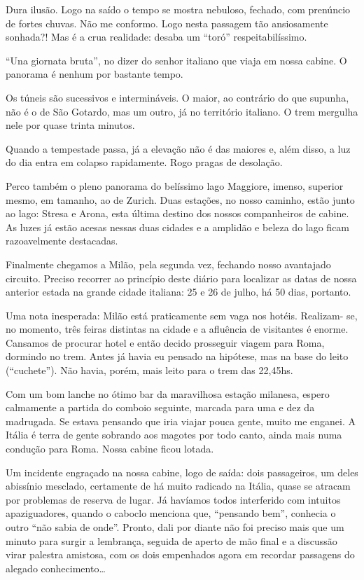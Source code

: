 Dura ilusão. Logo na saído o tempo se mostra nebuloso, fechado, com prenúncio de fortes chuvas. Não me conformo. Logo nesta passagem tão ansiosamente sonhada?! Mas é a crua realidade: desaba um ``toró'' respeitabilíssimo.

``Una giornata bruta'', no dizer do senhor italiano que viaja em nossa cabine. O panorama é nenhum por bastante tempo.

Os túneis são sucessivos e intermináveis. O maior, ao contrário do que supunha, não é o de São Gotardo, mas um outro, já no território italiano. O trem mergulha nele por quase trinta minutos.

Quando a tempestade passa, já a elevação não é das maiores e, além disso, a luz do dia entra em colapso rapidamente. Rogo pragas de desolação.

Perco também o pleno panorama do belíssimo lago Maggiore, imenso, superior mesmo, em tamanho, ao de Zurich. Duas estações, no nosso caminho, estão junto ao lago: Stresa e Arona, esta última destino dos nossos companheiros de cabine. As luzes já estão acesas nessas duas cidades e a amplidão e beleza do lago ficam razoavelmente destacadas.

Finalmente chegamos a Milão, pela segunda vez, fechando nosso avantajado circuito. Preciso recorrer ao princípio deste diário para localizar as datas de nossa anterior estada na grande cidade italiana: 25 e 26 de julho, há 50 dias, portanto.

Uma nota inesperada: Milão está praticamente sem vaga nos hotéis. Realizam- se, no momento, três feiras distintas na cidade e a afluência de visitantes é enorme. Cansamos de procurar hotel e então decido prosseguir viagem para Roma, dormindo no trem. Antes já havia eu pensado na hipótese, mas na base do leito (``cuchete''). Não havia, porém, mais leito para o trem das 22,45hs.

Com um bom lanche no ótimo bar da maravilhosa estação milanesa, espero calmamente a partida do comboio seguinte, marcada para uma e dez da madrugada. Se estava pensando que iria viajar pouca gente, muito me enganei. A Itália é terra de gente sobrando aos magotes por todo canto, ainda mais numa condução para Roma. Nossa cabine ficou lotada.

Um incidente engraçado na nossa cabine, logo de saída: dois passageiros, um deles abissínio mesclado, certamente de há muito radicado na Itália, quase se atracam por problemas de reserva de lugar. Já havíamos todos interferido com intuitos apaziguadores, quando o caboclo menciona que, ``pensando bem'', conhecia o outro ``não sabia de onde''. Pronto, dali por diante não foi preciso mais que um minuto para surgir a lembrança, seguida de aperto de mão final e a discussão virar palestra amistosa, com os dois empenhados agora em recordar passagens do alegado conhecimento\ldots

